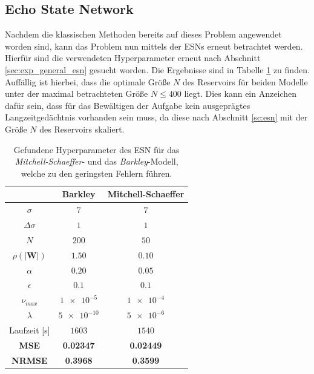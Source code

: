 \FloatBarrier
\subsection{Echo State Network}
Nachdem die klassischen Methoden bereits auf dieses Problem angewendet worden sind, kann das Problem nun mittels der \textsc{ESN}s erneut betrachtet werden. Hierfür sind die verwendeten Hyperparameter erneut nach Abschnitt \ref{sec:exp_general_esn} gesucht worden. Die Ergebnisse sind in Tabelle \ref{tab:exp_unblur_esn_results} zu finden. Auffällig ist hierbei, dass die optimale Größe $N$ des Reservoirs für beiden Modelle unter der maximal betrachteten Größe $N \leq 400$ liegt. Dies kann ein Anzeichen dafür sein, dass für das Bewältigen der Aufgabe kein ausgeprägtes Langzeitgedächtnis vorhanden sein muss, da diese nach Abschnitt \ref{sc:esn} mit der Größe $N$ des Reservoirs skaliert. 

\begin{table}[h]
	\centering
	\captionsetup{width=0.9\linewidth}
	\begin{tabular}{|c|c|c|}
		\multicolumn{1}{c|}{} &  Barkley & Mitchell-Schaeffer \\ 
		\hline \hline 
		\rule[-1ex]{0pt}{2.5ex} $\sigma$ & $7$ & $7$ \\ 
		\hline 
		\rule[-1ex]{0pt}{2.5ex} $\Delta \sigma$ & $1$ & $1$ \\ 
		\hline 
		\rule[-1ex]{0pt}{3.5ex} $N$ & $200$ & $50$ \\ 
		\hline 
		\rule[-1ex]{0pt}{3.5ex} $\rho(|\mathbf{W}|)$ & $1.50$ & $0.10$\\ 
		\hline 
		\rule[-1ex]{0pt}{3.5ex} $\alpha$ & $0.20$ & $0.05$ \\ 
		\hline 
		\rule[-1ex]{0pt}{3.5ex} $\epsilon$ & $0.1$ & $0.1$ \\ 
		\hline 
		\rule[-1ex]{0pt}{3.5ex} $\nu_{max}$ & $\num{1e-5}$ & $\num{1e-4}$\\ 
		\hline 
		\rule[-1ex]{0pt}{3.5ex} $\lambda$ & $\num{5e-10}$ & $\num{5e-6}$\\ 
		\hline 
		\rule[-1ex]{0pt}{2.5ex} Laufzeit [s] & $1603$ & $1540$ \\ 
		\hline 
		\rule[-1ex]{0pt}{2.5ex} \textbf{MSE} & \textbf{0.02347} & \textbf{0.02449} \\ 
		\hline
		\rule[-1ex]{0pt}{2.5ex} \textbf{NRMSE} & \textbf{0.3968} & \textbf{0.3599} \\ 
		\hline 
	\end{tabular} 
	\caption{Gefundene Hyperparameter des \textsc{ESN} für das \textit{Mitchell-Schaeffer}- und das \textit{Barkley}-Modell, welche zu den geringsten Fehlern führen.}
	\label{tab:exp_unblur_esn_results}
\end{table}

